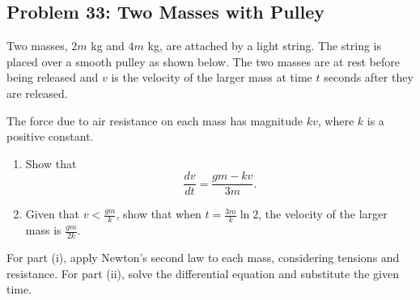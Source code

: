 \subsection{Problem 33: Two Masses with Pulley}

\begin{problem}
Two masses, $2m$ kg and $4m$ kg, are attached by a light string. The string is placed over a smooth pulley as shown below. The two masses are at rest before being released and $v$ is the velocity of the larger mass at time $t$ seconds after they are released.

\vspace{0.5em}
\noindent
\begin{center}
\end{center}
\vspace{0.3em}

The force due to air resistance on each mass has magnitude $kv$, where $k$ is a positive constant.

\begin{enumerate}
    \item[(i)] Show that
    \[
    \frac{dv}{dt} = \frac{gm - kv}{3m}.
    \]
    
    \item[(ii)] Given that $v < \frac{gm}{k}$, show that when $t = \frac{3m}{k}\ln 2$, the velocity of the larger mass is $\frac{gm}{2k}$.
\end{enumerate}
\end{problem}

\begin{hint}
For part (i), apply Newton's second law to each mass, considering tensions and resistance. For part (ii), solve the differential equation and substitute the given time.
\end{hint}


